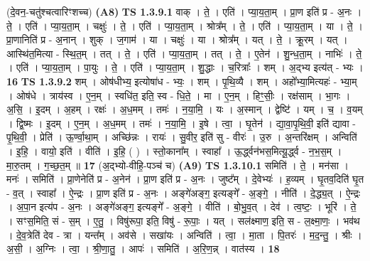\documentclass[17pt]{extarticle}
\begin{document}
                  \newline
                      (दे॒वन॒-चतु॑श्चत्वारिꣳशच्च)  \textbf{(A8)} \newline \newline
                                \textbf{ TS 1.3.9.1} \newline
                  वाक् । ते॒ । एति॑ । प्या॒य॒ता॒म् । प्रा॒ण इति॑ प्र - अ॒नः । ते॒ । एति॑ । प्या॒य॒ता॒म् । चक्षुः॑ । ते॒ । एति॑ । प्या॒य॒ता॒म् । श्रोत्र᳚म् । ते॒ । एति॑ । प्या॒य॒ता॒म् । या । ते॒ । प्रा॒णानिति॑ प्र - अ॒नान् । शुक् । ज॒गाम॑ । या । चक्षुः॑ । या । श्रोत्र᳚म् । यत् । ते॒ । क्रू॒रम् । यत् । आस्थि॑त॒मित्या - स्थि॒त॒म् । तत् । ते॒ । एति॑ । प्या॒य॒ता॒म् । तत् । ते॒ । ए॒तेन॑ । शु॒न्ध॒ता॒म् । नाभिः॑ । ते॒ । एति॑ । प्या॒य॒ता॒म् । पा॒युः । ते॒ । एति॑ । प्या॒य॒ता॒म् । शु॒द्धाः । च॒रित्राः᳚ । शम् । अ॒द्भ्य इत्य॑त् - भ्यः । \textbf{  16} \newline
                  \newline
                                \textbf{ TS 1.3.9.2} \newline
                  शम् । ओष॑धीभ्य॒ इत्योषा॑ध - भ्यः॒ । शम् । पृ॒थि॒व्यै । शम् । अहो᳚भ्या॒मित्यहः॑ - भ्या॒म् । ओष॑धे । त्राय॑स्व । ए॒न॒म् । स्वधि॑त॒ इति॒ स्व - धि॒ते॒ । मा । ए॒न॒म् । हिꣳ॒॒सीः॒ । रक्ष॑साम् । भा॒गः । अ॒सि॒ । इ॒दम् । अ॒हम् । रक्षः॑ । अ॒ध॒मम् । तमः॑ । न॒या॒मि॒ । यः । अ॒स्मान् । द्वेष्टि॑ । यम् । च॒ । व॒यम् । द्वि॒ष्मः । इ॒दम् । ए॒न॒म् । अ॒ध॒मम् । तमः॑ । न॒या॒मि॒ । इ॒षे । त्वा॒ । घृ॒तेन॑ । द्या॒वा॒पृ॒थि॒वी॒ इति॑ द्यावा - पृ॒थि॒वी॒ । प्रेति॑ । ऊ॒र्ण्वा॒था॒म् । अच्छि॑न्नः । रायः॑ । सु॒वीर॒ इति॑ सु - वीरः॑ । उ॒रु । अ॒न्तरि॑क्षम् । अन्विति॑ । इ॒हि॒ । वायो॒ इति॑ । वीति॑ । इ॒हि॒ ( ) । स्तो॒काना᳚म् । स्वाहा᳚ । ऊ॒र्द्ध्वन॑भस॒मित्यू॒र्द्ध्व - न॒भ॒स॒म् । मा॒रु॒तम् । ग॒च्छ॒त॒म् ॥ \textbf{  17} \newline
                  \newline
                      (अ॒द्भ्यो-वीहि॒-पञ्च॑ च)  \textbf{(A9)} \newline \newline
                                \textbf{ TS 1.3.10.1} \newline
                  समिति॑ । ते॒ । मन॑सा । मनः॑ । समिति॑ । प्रा॒णेनेति॑ प्र - अ॒नेन॑ । प्रा॒ण इति॑ प्र - अ॒नः । जुष्ट᳚म् । दे॒वेभ्यः॑ । ह॒व्यम् । घृ॒तव॒दिति॑ घृ॒त - व॒त् । स्वाहा᳚ । ऐ॒न्द्रः । प्रा॒ण इति॑ प्र - अ॒नः । अङ्गे॑अङ्ग॒ इत्यङ्गे᳚ - अ॒ङ्गे॒ । नीति॑ । दे॒द्ध्य॒त् । ऐ॒न्द्रः । अ॒पा॒न इत्य॑प - अ॒नः । अङ्गे॑अङ्ग॒ इत्यङ्गे᳚ - अ॒ङ्गे॒ । वीति॑ । बो॒भु॒व॒त् । देव॑ । त्व॒ष्टः॒ । भूरि॑ । ते॒ । सꣳस॒मिति॒ सं - स॒म् । ए॒तु॒ । विषु॑रूपा॒ इति॒ विषु॑ - रू॒पाः॒ । यत् । सल॑क्ष्माण॒ इति॒ स - ल॒क्ष्मा॒णः॒ । भव॑थ । दे॒व॒त्रेति॑ देव - त्रा । यन्त᳚म् । अव॑से । सखा॑यः । अन्विति॑ । त्वा॒ । मा॒ता । पि॒तरः॑ । म॒द॒न्तु॒ । श्रीः । अ॒सी॒ । अ॒ग्निः । त्वा॒ । श्री॒णा॒तु॒ । आपः॑ । समिति॑ । अ॒रि॒ण॒न्न् । वात॑स्य । \textbf{  18} \newline
\end{document}
